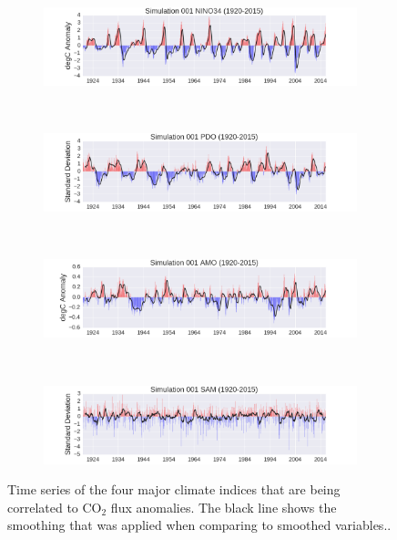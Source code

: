 \documentclass[12pt]{article}
\begin{document}
\clearpage
\begin{figure}[!h]
	\centering
	\begin{subfigure}[b]{\textwidth}
		\centering
		\includegraphics[width=\linewidth]{../../figs/all-systems/timeseries/filtered-nino34-001-example.png}
	\end{subfigure} \\
	\begin{subfigure}[b]{\textwidth}
		\centering
		\includegraphics[width=\linewidth]{../../figs/all-systems/timeseries/filtered-pdo-001-example.png}
	\end{subfigure} \\
	\begin{subfigure}[b]{\textwidth}
		\centering
		\includegraphics[width=\linewidth]{../../figs/all-systems/timeseries/filtered-amo-001-example.png}
	\end{subfigure} \\
	\begin{subfigure}[b]{\textwidth}
		\centering
		\includegraphics[width=\linewidth]{../../figs/all-systems/timeseries/filtered-sam-001-example.png}
	\end{subfigure}
	\caption{Time series of the four major climate indices that are being correlated to CO$_{2}$ flux anomalies. The black line shows the smoothing that was applied when comparing to smoothed variables..}
	\label{fig:climate-indices}
\end{figure}
\end{document}
